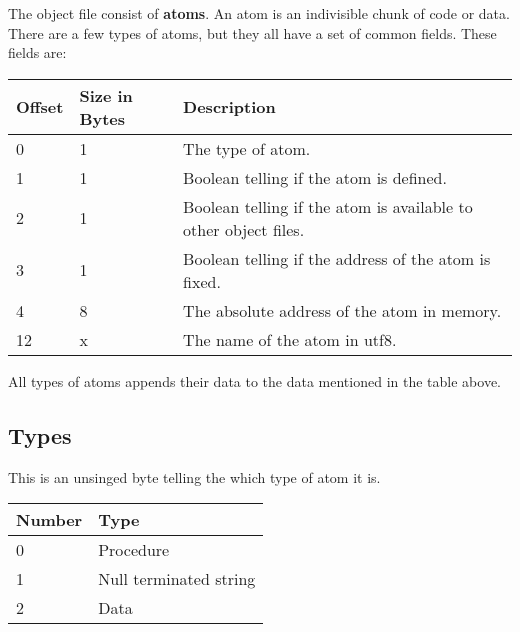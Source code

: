 The object file consist of \textbf{atoms}. An atom is an indivisible chunk of
code or data. There are a few types of atoms, but they all have a set of common
fields. These fields are:

\begin{table}[h]
    \centering
    \label{tbl:atom}
    \begin{tabular}{|l|l|l|}
        \hline
        \textbf{Offset} & \textbf{Size in Bytes} & \textbf{Description}                                            \\ \hline
        0               & 1                      & The type of atom.                                               \\ \hline
        1               & 1                      & Boolean telling if the atom is defined.                         \\ \hline
        2               & 1                      & Boolean telling if the atom is available to other object files. \\ \hline
        3               & 1                      & Boolean telling if the address of the atom is fixed.            \\ \hline
        4               & 8                      & The absolute address of the atom in memory.                     \\ \hline
        12              & x                      & The name of the atom in utf8.                                   \\ \hline
    \end{tabular}
\end{table}

All types of atoms appends their data to the data mentioned in the table above.

\subsection{Types}
This is an unsinged byte telling the which type of atom it is.

\begin{table}[h]
    \centering
    \label{tbl:type}
    \begin{tabular}{|l|l|}
        \hline
        \textbf{Number} & \textbf{Type}          \\ \hline
        0               & Procedure              \\ \hline
        1               & Null terminated string \\ \hline
        2               & Data                   \\ \hline
    \end{tabular}
\end{table}

